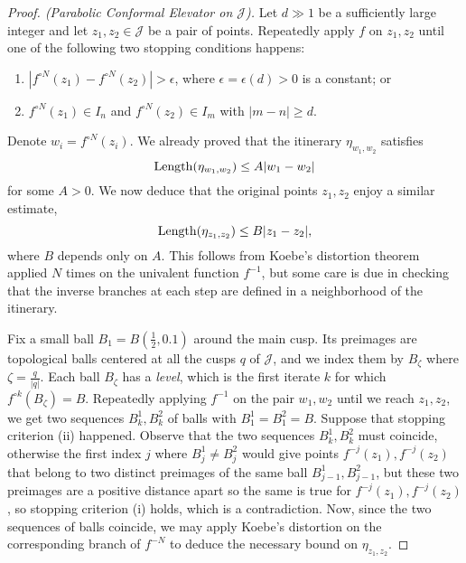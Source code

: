 \begin{proof}[Proof. (Parabolic Conformal Elevator on $\mathcal J$)] \label{parabolic-elevator}
Let $d\gg 1$ be a sufficiently large integer and let $z_1,z_2 \in \mathcal J$ be a pair of points. Repeatedly apply $f$ on $z_1,z_2$ until one of the following two stopping conditions happens:
\begin{enumerate}[label=\normalfont(\roman*)]
	\item $\left|f^{\circ N}(z_1)-f^{\circ N}(z_2)\right|>\epsilon$, where $\epsilon=\epsilon(d)>0$ is a constant;		
	or
	\item $f^{\circ N }(z_1) \in I_n$ and $f^{\circ N }(z_2) \in I_m$ with $|m-n| \geq d$.		
\end{enumerate}

Denote $w_i=f^{\circ N}(z_i)$. We already proved that the itinerary $\eta_{w_1,w_2}$ satisfies
\begin{equation*}
	\operatorname{Length}(\eta_{w_1,w_2}) \leq A |w_1-w_2|
\end{equation*}
for some $A>0$. We now deduce that the original points $z_1,z_2$ enjoy a similar estimate,
\begin{equation*}
	\operatorname{Length}(\eta_{z_1,z_2}) \leq B |z_1-z_2|,
\end{equation*}
where $B$ depends only on $A$. This follows from Koebe's distortion theorem applied $N$ times on the univalent function $f^{-1}$, but some care is due in checking that the inverse branches at each step are defined in a neighborhood of the itinerary.

Fix a small ball $B_1=B(\frac 12, 0.1)$ around the main cusp. Its preimages are topological balls centered at all the cusps $q$ of $\mathcal J$, and we index them by $B_\zeta$ where $\zeta=\frac q{|q|}$. Each ball $B_{\zeta}$ has a \emph{level}, which is the first iterate $k$ for which $f^{\circ k}(B_{\zeta}) = B$. Repeatedly applying $f^{-1}$ on the pair $w_1,w_2$ until we reach $z_1,z_2$, we get two sequences $B^1_k, B^2_k$ of balls with $B^1_1=B^2_1=B$. 
Suppose that stopping criterion (ii) happened. Observe that the two sequences  $B^1_k, B^2_k$ must coincide, otherwise the first index $j$ where $B^1_j \neq B^2_j$ would give points $f^{-j}(z_1), f^{-j}(z_2)$ that belong to two distinct preimages of the same ball $B^1_{j-1}, B^2_{j-1}$, but these two preimages are a positive distance apart so the same is true for $f^{-j}(z_1), f^{-j}(z_2)$, so stopping criterion (i) holds, which is a contradiction.
Now, since the two sequences of balls coincide, we may apply Koebe's distortion on the corresponding branch of $f^{-N}$ to deduce the necessary bound on $\eta_{z_1,z_2}$.


\end{proof}
